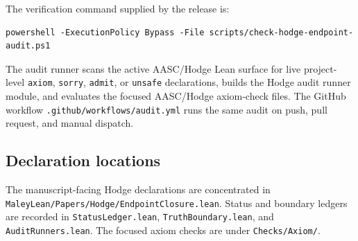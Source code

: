 \documentclass[11pt]{article}
\begin{document}
The verification command supplied by the release is:
\begin{verbatim}
powershell -ExecutionPolicy Bypass -File scripts/check-hodge-endpoint-audit.ps1
\end{verbatim}
The audit runner scans the active AASC/Hodge Lean surface for live project-level \texttt{axiom}, \texttt{sorry}, \texttt{admit}, or \texttt{unsafe} declarations, builds the Hodge audit runner module, and evaluates the focused AASC/Hodge axiom-check files. The GitHub workflow \texttt{.github/workflows/audit.yml} runs the same audit on push, pull request, and manual dispatch.

\subsection{Declaration locations}

The manuscript-facing Hodge declarations are concentrated in \texttt{MaleyLean/Papers/Hodge/EndpointClosure.lean}. Status and boundary ledgers are recorded in \texttt{StatusLedger.lean}, \texttt{TruthBoundary.lean}, and \texttt{AuditRunners.lean}. The focused axiom checks are under \texttt{Checks/Axiom/}.
\end{document}
